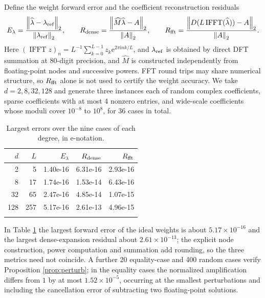 \documentclass[10pt,twoside,final]{siamart1116}
\numberwithin{equation}{section}
\numberwithin{theorem}{section}
\newcommand{\norm}[1]{\left\lVert#1\right\rVert_2}
\newcommand{\e}{\mathrm e}
\newcommand{\ii}{\mathrm i}
\begin{document}
Define the weight forward error and the coefficient reconstruction residuals
\begin{equation}\label{eq:metrics}
E_\lambda=\frac{\norm{\widehat\lambda-\lambda_{\rm ref}}}{\norm{\lambda_{\rm ref}}},\qquad
R_{\rm dense}=\frac{\norm{\widehat M\widehat\lambda-A}}{\norm A},\qquad
R_{\rm fft}=\frac{\norm{D(L\operatorname{IFFT}(\widehat\lambda))-A}}{\norm A}.
\end{equation}
Here $(\operatorname{IFFT}z)_n=L^{-1}\sum_{k=0}^{L-1}z_k\e^{2\pi\ii nk/L}$,
and $\lambda_{\rm ref}$ is obtained by direct DFT summation at 80-digit precision, and
$\widehat M$ is constructed independently from floating-point nodes and successive
powers. FFT round trips may share numerical structure, so $R_{\rm fft}$ alone is not
used to certify the weight accuracy. We take $d=2,8,32,128$ and generate three instances
each of random complex coefficients, sparse coefficients with at most 4 nonzero entries,
and wide-scale coefficients whose moduli cover $10^{-8}$ to $10^8$, for 36 cases in
total.

\begin{table}[htbp]\centering\small
\caption{Largest errors over the nine cases of each degree, in e-notation.}\label{tab:accuracy}
\begin{tabular}{rrrrr}\toprule
$d$ & $L$ & $E_\lambda$ & $R_{\rm dense}$ & $R_{\rm fft}$\\\midrule
2 & 5 & 1.40e-16 & 6.31e-16 & 2.93e-16 \\
8 & 17 & 1.74e-16 & 1.53e-14 & 6.43e-16 \\
32 & 65 & 2.47e-16 & 4.85e-14 & 1.07e-15 \\
128 & 257 & 5.17e-16 & 2.61e-13 & 4.96e-15 \\
\\[-.8em]\bottomrule\end{tabular}
\end{table}

In Table \ref{tab:accuracy} the largest forward error of the ideal weights is about
$5.17\times10^{-16}$ and the largest dense-expansion residual about $2.61\times10^{-13}$;
the explicit node construction, power computation and summation add rounding, so the
three metrics need not coincide. A further 20 equality-case and 400 random cases verify
Proposition \ref{prop:perturb}; in the equality cases the normalized amplification
differs from $1$ by at most $1.52\times10^{-5}$, occurring at the smallest perturbations
and including the cancellation error of subtracting two floating-point solutions.
\end{document}
